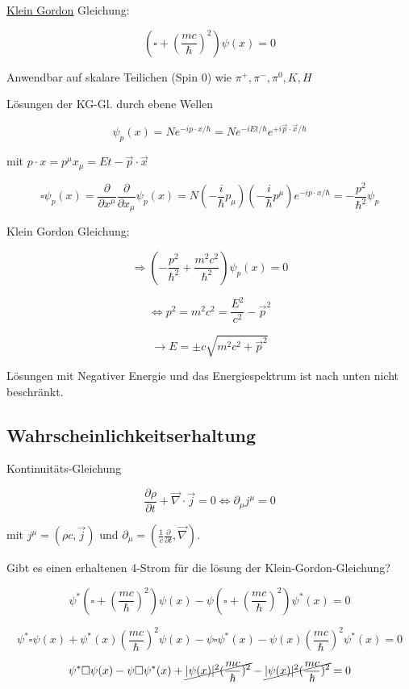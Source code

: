 \underline{Klein Gordon} Gleichung:

\[\boxed{\left(\square + \left(\frac{mc}{\hbar}\right)^2\right)\psi(x) = 0}\]

Anwendbar auf skalare Teilichen (Spin 0) wie \(\pi^+,\pi^-,\pi^0,K,H\)

Lösungen der KG-Gl. durch ebene Wellen

\[\psi_p(x) = N e^{-ip\cdot x/\hbar} = Ne^{-iEt/\hbar}e^{+i\vec p\cdot\vec x/\hbar}\]

mit \(p\cdot x = p^\mu x_\mu = Et-\vec p\cdot \vec x\)

\[\square \psi_p (x) = \frac{\partial}{\partial x^\mu} \frac{\partial}{\partial x_\mu} \psi_p(x) = N(-\frac{i}{\hbar}p_\mu)(-\frac{i}{\hbar}p^\mu) e^{-ip\cdot x/\hbar} = -\frac{p^2}{\hbar^2}\psi_p \]


Klein Gordon Gleichung:

\[\Rightarrow \left(-\frac{p^2}{\hbar^2} + \frac{m^2c^2}{\hbar^2}\right)\psi_p(x) = 0\]

\[ \Leftrightarrow p^2 = m^2 c^2 = \frac{E^2}{c^2}-\vec p^2\]

\[\rightarrow E = \pm c \sqrt{m^2c^2+\vec p^2}\]


Lösungen mit Negativer Energie und das Energiespektrum ist nach unten nicht beschränkt. 



\subsection{Wahrscheinlichkeitserhaltung}

Kontinuitäts-Gleichung

 \[\frac{\partial\rho}{\partial t}+\vec \nabla\cdot \vec j = 0 \Leftrightarrow \partial_\mu j^\mu = 0\]

mit \(j^\mu = (\rho c,\vec j)\) und \(\partial_\mu = (\frac{1}{c} \frac{\partial}{\partial t},\vec \nabla )\). 


Gibt es einen erhaltenen 4-Strom für die lösung der Klein-Gordon-Gleichung?

\[\psi^*(\square + (\frac{mc}{\hbar})^2)\psi(x) - \psi(\square + (\frac{mc}{\hbar})^2)\psi^*(x) = 0\]

\[\psi^*\square\psi(x) + \psi^*(x)(\frac{mc}{\hbar})^2\psi(x) - \psi\square\psi^*(x) - \psi(x)(\frac{mc}{\hbar})^2\psi^*(x) = 0\]

\[\psi^*\square\psi(x) -  \psi\square\psi^*(x) + \cancel{|\psi(x)|^2(\frac{mc}{\hbar})^2} -\cancel{|\psi(x)|^2(\frac{mc}{\hbar})^2} = 0\]

